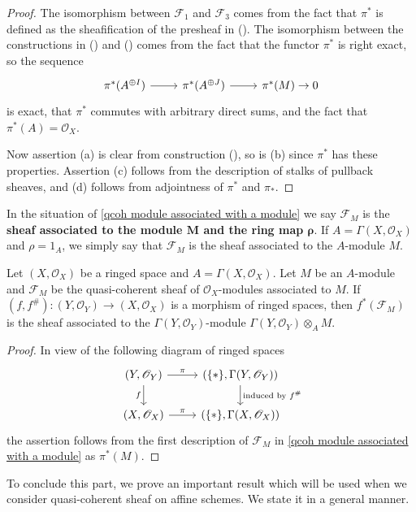 \begin{proof}
The isomorphism between $\mathscr{F}_1$ and $\mathscr{F}_3$ comes from the fact that $\pi^*$ is defined as the sheafification of the presheaf in (). The isomorphism between the constructions in () and () comes from the fact that the functor $\pi^*$ is right exact, so the sequence
\[\begin{tikzcd}
\pi^*(A^{\oplus I})\ar[r]&\pi^*(A^{\oplus J})\ar[r]&\pi^*(M)\to 0
\end{tikzcd}\] 
is exact, that $\pi^*$ commutes with arbitrary direct sums, and the fact that $\pi^*(A)=\mathscr{O}_X$.\par
Now assertion (a) is clear from construction (), so is (b) since $\pi^*$ has these properties. Assertion (c) follows from the description of stalks of pullback sheaves, and (d) follows from adjointness of $\pi^*$ and $\pi_*$.
\end{proof}
In the situation of \cref{qcoh module associated with a module} we say $\mathscr{F}_M$ is the \textbf{sheaf associated to the module $\bm{M}$ and the ring map $\bm{\rho}$}. If $A=\Gamma(X,\mathscr{O}_X)$ and $\rho=1_A$, we simply say that $\mathscr{F}_M$ is the sheaf associated to the $A$-module $M$.
\begin{proposition}\label{qcoh module associated with a module and pull back}
Let $(X,\mathscr{O}_X)$ be a ringed space and $A=\Gamma(X,\mathscr{O}_X)$. Let $M$ be an $A$-module and $\mathscr{F}_M$ be the quasi-coherent sheaf of $\mathscr{O}_X$-modules associated to $M$. If $(f,f^{\#}):(Y,\mathscr{O}_Y)\to(X,\mathscr{O}_X)$ is a morphism of ringed spaces, then $f^*(\mathscr{F}_M)$ is the sheaf associated to the $\Gamma(Y,\mathscr{O}_Y)$-module $\Gamma(Y,\mathscr{O}_Y)\otimes_AM$.
\end{proposition}
\begin{proof}
In view of the following diagram of ringed spaces
\begin{equation*}
\begin{tikzcd}
(Y,\mathscr{O}_Y)\ar[r,"\pi"]\ar[d,swap,"f"]&(\{\ast\},\Gamma(Y,\mathscr{O}_Y))\ar[d,"\text{induced by $f^{\#}$}"]\\
(X,\mathscr{O}_X)\ar[r,"\pi"]&(\{\ast\},\Gamma(X,\mathscr{O}_X))
\end{tikzcd}
\end{equation*}
the assertion follows from the first description of $\mathscr{F}_M$ in \cref{qcoh module associated with a module} as $\pi^*(M)$.
\end{proof}
To conclude this part, we prove an important result which will be used when we consider quasi-coherent sheaf on affine schemes. We state it in a general manner.
